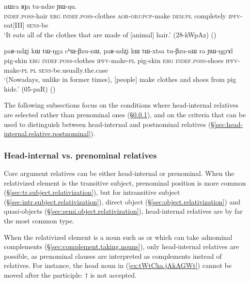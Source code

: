 \begin{exe}
\ex \label{ex:tWNga.thWkABzu}
 nɯra ʁɟa tu-ndze ɲɯ-ŋu. \\
\textsc{indef}.\textsc{poss}-hair \textsc{erg} \textsc{indef}.\textsc{poss}-clothes \textsc{aor}-\textsc{obj}:\textsc{pcp}-make \textsc{dem}:\textsc{pl} completely \textsc{ipfv}-eat[III] \textsc{sens}-be \\
\glt `It eats all of the clothes that are made of [animal] hair.' (28-kWpAz)
()
\end{exe} 

\begin{exe}
\ex \label{ex:tWNga.chWBzunW}
\gll paʁ-ndʐi kɯ tɯ-ŋga cʰɯ-βzu-nɯ, paʁ-ndʐi kɯ tɯ-xtsa tu-βzu-nɯ ra ɲɯ-ŋgrɤl \\
pig-skin \textsc{erg} \textsc{indef}.\textsc{poss}-clothes \textsc{ipfv}-make-\textsc{pl} pig-skin \textsc{erg} \textsc{indef}.\textsc{poss}-shoes \textsc{ipfv}-make-\textsc{pl} \textsc{pl} \textsc{sens}-be.usually.the.case \\
\glt `(Nowadays, unlike in former times), [people] make clothes and shoes from pig hide.' (05-paR)
()
\end{exe} 

The following subsections focus on the conditions where head-internal relatives are selected rather than prenominal ones (§\ref{sec:head-internal.relative.prenominal}), and on the criteria that can be used to distinguish between head-internal and postnominal relatives (§\ref{sec:head-internal.relative.postnominal}).

\subsubsection{Head-internal vs. prenominal relatives} \label{sec:head-internal.relative.prenominal}
Core argument relatives can be either head-internal or prenominal. When the relativized element is the transitive subject, prenominal position is more common (§\ref{sec:tr.subject.relativization}), but for intransitive subject (§\ref{sec:intr.subject.relativization}), direct object (§\ref{sec:object.relativization}) and quasi-objects (§\ref{sec:semi.object.relativization}), head-internal relatives are by far the most common type. 

When the relativized element is a noun such as  or  which can take adnominal complements (§\ref{sec:complement.taking.nouns}), only head-internal relatives are possible, as prenominal clauses are interpreted as complements instead of relatives. For instance, the head noun  in  (\ref{ex:tWtCha.jAkAGWt}) cannot be moved after the participle: $\dagger$ is not accepted.


